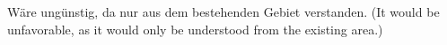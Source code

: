 Wäre ungünstig, da nur aus dem bestehenden Gebiet verstanden.  
(It would be unfavorable, as it would only be understood from the existing area.)